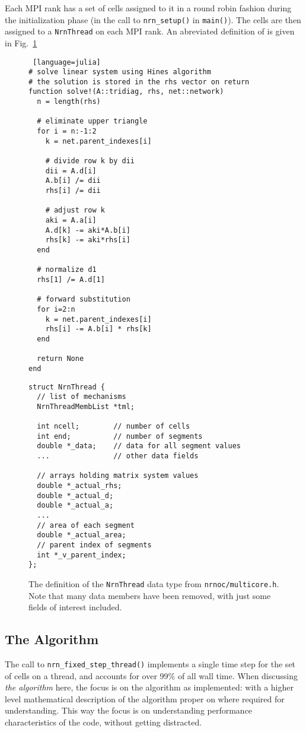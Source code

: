 \documentclass[11pt,a4paper]{article}
\newcommand{\lst}[1]{\lstinline!#1!} %
\newcommand{\fig}[1]{Fig.~\ref{#1}} %
\newcommand{\file}[1]{\lstinline[basicstyle=\normalsize,]!#1!} %
\begin{document}
Each MPI rank has a set of cells assigned to it in a round robin fashion during the initialization phase (in the call to \lst{nrn_setup()} in \lst{main()}). The cells are then assigned to a \lst{NrnThread} on each MPI rank. An abreviated definition of is given in \fig{lst:NrnThread}
\begin{figure}
\begin{lstlisting} [language=julia]
# solve linear system using Hines algorithm
# the solution is stored in the rhs vector on return
function solve!(A::tridiag, rhs, net::network)
  n = length(rhs)

  # eliminate upper triangle
  for i = n:-1:2
    k = net.parent_indexes[i]

    # divide row k by dii
    dii = A.d[i]
    A.b[i] /= dii
    rhs[i] /= dii

    # adjust row k
    aki = A.a[i]
    A.d[k] -= aki*A.b[i]
    rhs[k] -= aki*rhs[i]
  end

  # normalize d1
  rhs[1] /= A.d[1]

  # forward substitution
  for i=2:n
    k = net.parent_indexes[i]
    rhs[i] -= A.b[i] * rhs[k]
  end

  return None
end
\end{lstlisting}
\end{figure}

\begin{figure}
\begin{lstlisting}
struct NrnThread {
  // list of mechanisms
  NrnThreadMembList *tml;

  int ncell;        // number of cells
  int end;          // number of segments
  double *_data;    // data for all segment values
  ...               // other data fields

  // arrays holding matrix system values
  double *_actual_rhs;
  double *_actual_d;
  double *_actual_a;
  ...
  // area of each segment
  double *_actual_area;
  // parent index of segments
  int *_v_parent_index;
};
\end{lstlisting}
\label{lst:NrnThread}
\caption{The definition of the \lst{NrnThread} data type from \file{nrnoc/multicore.h}. Note that many data members have been removed, with just some fields of interest included.}
\end{figure}

\subsection{The Algorithm}
The call to \lst{nrn_fixed_step_thread()} implements a single time step for the set of cells on a thread, and accounts for over 99\% of all wall time. When discussing \emph{the algorithm} here, the focus is on the algorithm as implemented: with a higher level mathematical description of the algorithm proper on where required for understanding. This way the focus is on understanding performance characteristics of the code, without getting distracted.
\end{document}
